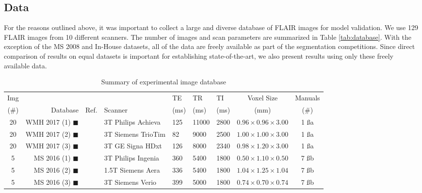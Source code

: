 \subsection{Data}
For the reasons outlined above, it was important to collect a large and diverse database of FLAIR images for model validation. We use 129 FLAIR images from 10 different scanners. The number of images and scan parameters are summarized in Table \ref{tab:database}. With the exception of the MS 2008 and In-House datasets, all of the data are freely available as part of the segmentation competitions. Since direct comparison of results on equal datasets is important for establishing state-of-the-art, we also present results using only these freely available data.
\begin{table}[t]
  \centering
  \caption{Summary of experimental image database}\vspace{0.5em}
  {\setlength{\tabcolsep}{4pt}
    \begin{tabu} to \textwidth {crclX[c]X[c]X[c]cc}
    	\hline
    	Img  &                                          &                   &                    & TE   & TR    & TI   &         Voxel Size         & Manuals  \\
    	(\#) &                                 Database &       Ref.        & Scanner            & (ms) & (ms)  & (ms) &            (mm)            &   (\#)   \\   & WMH 2017 (1) {\color{c01}$\blacksquare$} & \cite{WMHSEG2017} & 3T Philips Achieva & 125  & 11000 & 2800 & $0.96\times0.96\times3.00$ & 1 \ss{a} \\
    	 20  & WMH 2017 (2) {\color{c02}$\blacksquare$} & \cite{WMHSEG2017} & 3T Siemens TrioTim & 82   & 9000  & 2500 & $1.00\times1.00\times3.00$ & 1 \ss{a} \\
    	 20  & WMH 2017 (3) {\color{c03}$\blacksquare$} & \cite{WMHSEG2017} & 3T GE Signa HDxt   & 126  & 8000  & 2340 & $0.98\times1.20\times3.00$ & 1 \ss{a} \\
    	 5   & MS 2016  (1) {\color{c04}$\blacksquare$} & \cite{MSSEG2016}  & 3T Philips Ingenia & 360  & 5400  & 1800 & $0.50\times1.10\times0.50$ & 7 \ss{b} \\
    	 5   & MS 2016  (2) {\color{c05}$\blacksquare$} & \cite{MSSEG2016}  & 1.5T Siemens Aera  & 336  & 5400  & 1800 & $1.04\times1.25\times1.04$ & 7 \ss{b} \\
    	 5   & MS 2016  (3) {\color{c06}$\blacksquare$} & \cite{MSSEG2016}  & 3T Siemens Verio   & 399  & 5000  & 1800 & $0.74\times0.70\times0.74$ & 7 \ss{b} \\

\end{tabu}}
\end{table}
